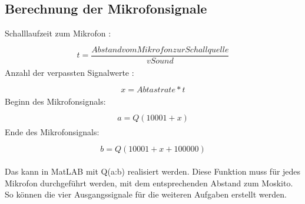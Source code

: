 \subsection{Berechnung der Mikrofonsignale}
Schalllaufzeit zum Mikrofon :
\begin{align}
\begin{split}
\\ t = \dfrac{Abstand vom Mikrofon zur Schallquelle}{vSound}
\end{split}
\end{align}
Anzahl der verpassten Signalwerte :
\begin{align}
\begin{split}
\\ x = Abtastrate * t
\end{split}
\end{align}
Beginn des Mikrofonsignals:
\begin{align}
\begin{split}
\\ a = Q(10001 + x)
\end{split}
\end{align}
Ende des Mikrofonsignals:
\begin{align}
\begin{split}
 \\b = Q(10001 + x + 100000)
\end{split}
\end{align}

Das kann in MatLAB mit Q(a:b) realisiert werden.
Diese Funktion muss für jedes Mikrofon durchgeführt werden, mit dem entsprechenden Abstand zum Moskito.
So können die vier Ausgangssignale für die weiteren Aufgaben erstellt werden.
